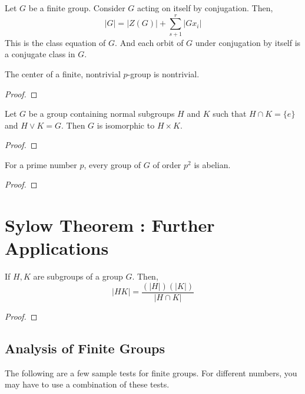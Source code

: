 \begin{definition}
	Let $G$ be a finite group.
	Consider $G$ acting on itself by conjugation. Then,
	\begin{equation}|G| = |Z(G)| + \sum_{s+1}^r |Gx_i|
	\end{equation}
	This is the class equation of $G$.
	And each orbit of $G$ under conjugation by itself is a conjugate class in $G$.
\end{definition}

\begin{theorem}
	The center of a finite, nontrivial $p$-group is nontrivial.
\end{theorem}
\begin{proof}
\end{proof}

\begin{lemma}
	Let $G$ be a group containing normal subgroups $H$ and $K$ such that $H \cap K = \{e\}$ and $H \vee K = G$.
	Then $G$ is isomorphic to $H \times K$.
\end{lemma}
\begin{proof}
\end{proof}

\begin{theorem}
	For a prime number $p$, every group of $G$ of order $p^2$ is abelian.
\end{theorem}
\begin{proof}
\end{proof}


\section{Sylow Theorem : Further Applications}
\begin{theorem}
	If $H,K$ are subgroups of a group $G$. Then,
	\begin{equation}
		|HK| = \frac{(|H|)(|K|)}{|H\cap K|}
	\end{equation}
\end{theorem}
\begin{proof}
\end{proof}

\subsection{Analysis of Finite Groups} %
	The following are a few sample tests for finite groups. For different numbers, you may have to use a combination of these tests.

